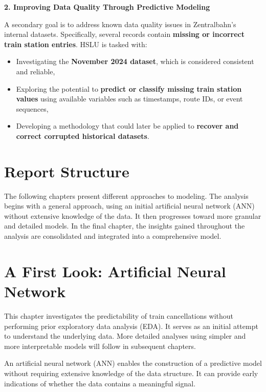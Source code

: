 \documentclass[
]{article}
\providecommand{\tightlist}{%
  \setlength{\itemsep}{0pt}\setlength{\parskip}{0pt}}
\begin{document}
\textbf{2. Improving Data Quality Through Predictive Modeling }

A secondary goal is to address known data quality issues in
Zentralbahn's internal datasets. Specifically, several records contain
\textbf{missing or incorrect train station entries}. HSLU is tasked
with:

\begin{itemize}
\tightlist
\item
  Investigating the \textbf{November 2024 dataset}, which is considered
  consistent and reliable,
\item
  Exploring the potential to \textbf{predict or classify missing train
  station values} using available variables such as timestamps, route
  IDs, or event sequences,
\item
  Developing a methodology that could later be applied to
  \textbf{recover and correct corrupted historical datasets}.
\end{itemize}

\section{Report Structure}\label{report-structure}

The following chapters present different approaches to modeling. The
analysis begins with a general approach, using an initial artificial
neural network (ANN) without extensive knowledge of the data. It then
progresses toward more granular and detailed models. In the final
chapter, the insights gained throughout the analysis are consolidated
and integrated into a comprehensive model.

\section{A First Look: Artificial Neural
Network}\label{a-first-look-artificial-neural-network}

This chapter investigates the predictability of train cancellations
without performing prior exploratory data analysis (EDA). It serves as
an initial attempt to understand the underlying data. More detailed
analyses using simpler and more interpretable models will follow in
subsequent chapters.

An artificial neural network (ANN) enables the construction of a
predictive model without requiring extensive knowledge of the data
structure. It can provide early indications of whether the data contains
a meaningful signal.
\end{document}
